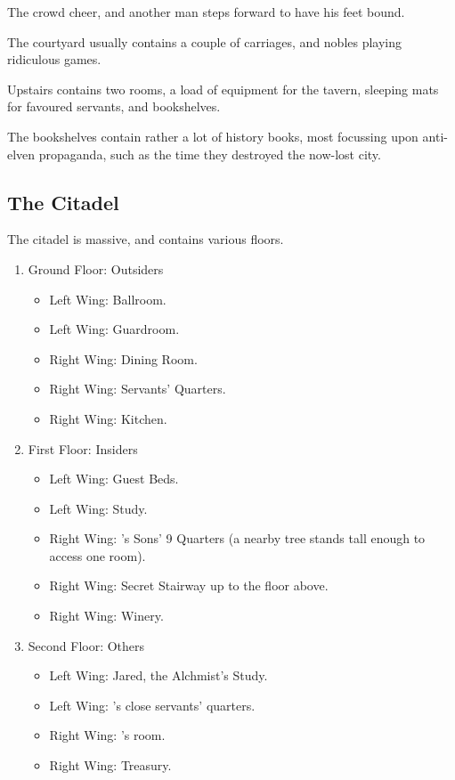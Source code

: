 \begin{multicols}{2}
\begin{boxtext}
	The crowd cheer, and another man steps forward to have his feet bound.

\end{boxtext}

The courtyard usually contains a couple of carriages, and nobles playing ridiculous games.



Upstairs contains two rooms, a load of equipment for the tavern, sleeping mats for favoured servants, and bookshelves.

The bookshelves contain rather a lot of history books, most focussing upon anti-elven propaganda, such as the time they destroyed the now-lost city.
 
\subsection{The Citadel}\label{citadel}

The citadel is massive, and contains various floors.

\begin{enumerate}

	\item{Ground Floor: Outsiders}
		\begin{itemize}
			\item{Left Wing: Ballroom.}
			\item{Left Wing: Guardroom.}
			\item{Right Wing: Dining Room.}
			\item{Right Wing: Servants' Quarters.}
			\item{Right Wing: Kitchen.}
		\end{itemize}
	\item{First Floor: Insiders}
		\begin{itemize}
			\item{Left Wing: Guest Beds.}
			\item{Left Wing: Study.}
			\item{Right Wing: 's Sons' 9 Quarters (a nearby tree stands tall enough to access one room).}
			\item{Right Wing: Secret Stairway up to the floor above.}
			\item{Right Wing: Winery.}
		\end{itemize}

	\item{Second Floor: Others}
		\begin{itemize}
			\item{Left Wing: Jared, the Alchmist's Study.}
			\item{Left Wing: 's close servants' quarters.}
			\item{Right Wing: 's room.}
			\item{Right Wing: Treasury.}
		\end{itemize}


\end{enumerate}
\end{multicols}
